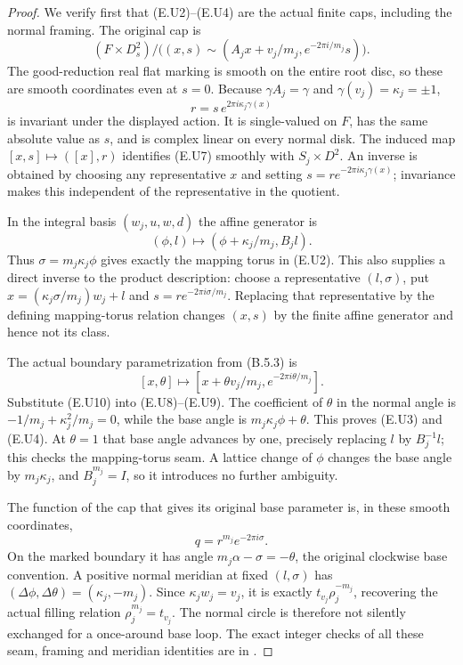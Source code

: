 \begin{proof}
We verify first that (E.U2)--(E.U4) are the actual finite caps,
including the normal framing.  The original cap is
\[
 (F\times D^2_s)/
 \bigl((x,s)\sim(A_jx+v_j/m_j,e^{-2\pi i/m_j}s)\bigr).
 \tag{E.U7}
\]
The good-reduction real flat marking is smooth on the entire
root disc, so these are smooth coordinates even at $s=0$.
Because $\gamma A_j=\gamma$ and $\gamma(v_j)=\kappa_j=\pm1$,
\[
                  r=s\,e^{2\pi i\kappa_j\gamma(x)}
 \tag{E.U8}
\]
is invariant under the displayed action.  It is single-valued
on $F$, has the same absolute value as $s$, and is complex
linear on every normal disk.  The induced map
$[x,s]\mapsto([x],r)$ identifies (E.U7) smoothly with
$S_j\times D^2$.  An inverse is obtained by choosing any
representative $x$ and setting
$s=r e^{-2\pi i\kappa_j\gamma(x)}$; invariance makes this
independent of the representative in the quotient.

In the integral basis $(w_j,u,w,d)$ the affine generator is
\[
                  (\phi,l)\longmapsto
                     (\phi+\kappa_j/m_j,B_jl).
 \tag{E.U9}
\]
Thus $\sigma=m_j\kappa_j\phi$ gives exactly the mapping torus
in (E.U2).  This also supplies a direct inverse to the product
description: choose a representative $(l,\sigma)$, put
$x=(\kappa_j\sigma/m_j)w_j+l$ and
$s=r e^{-2\pi i\sigma/m_j}$.  Replacing that representative
by the defining mapping-torus relation changes $(x,s)$ by
the finite affine generator and hence not its class.

The actual boundary parametrization from (B.5.3) is
\[
 [x,\theta]\longmapsto
       [x+\theta v_j/m_j,e^{-2\pi i\theta/m_j}].
 \tag{E.U10}
\]
Substitute (E.U10) into (E.U8)--(E.U9).  The coefficient of
$\theta$ in the normal angle is
$-1/m_j+\kappa_j^2/m_j=0$, while the base angle is
$m_j\kappa_j\phi+\theta$.  This proves (E.U3) and (E.U4).
At $\theta=1$ that base angle advances by one, precisely
replacing $l$ by $B_j^{-1}l$; this checks the mapping-torus
seam.  A lattice change of $\phi$ changes the base angle by
$m_j\kappa_j$, and $B_j^{m_j}=I$, so it introduces no further
ambiguity.

The function of the cap that gives its original base parameter
is, in these smooth coordinates,
\[
                         q=r^{m_j}e^{-2\pi i\sigma}.
 \tag{E.U11}
\]
On the marked boundary it has angle
$m_j\alpha-\sigma=-\theta$, the original clockwise base
convention.  A positive normal meridian at fixed
$(l,\sigma)$ has $(\Delta\phi,\Delta\theta)=(\kappa_j,-m_j)$.
Since $\kappa_jw_j=v_j$, it is exactly $t_{v_j}\rho_j^{-m_j}$,
recovering the actual filling relation
$\rho_j^{m_j}=t_{v_j}$.  The normal circle is therefore not
silently exchanged for a once-around base loop.  The exact
integer checks of all these seam, framing and meridian
identities are in .


\end{proof}
